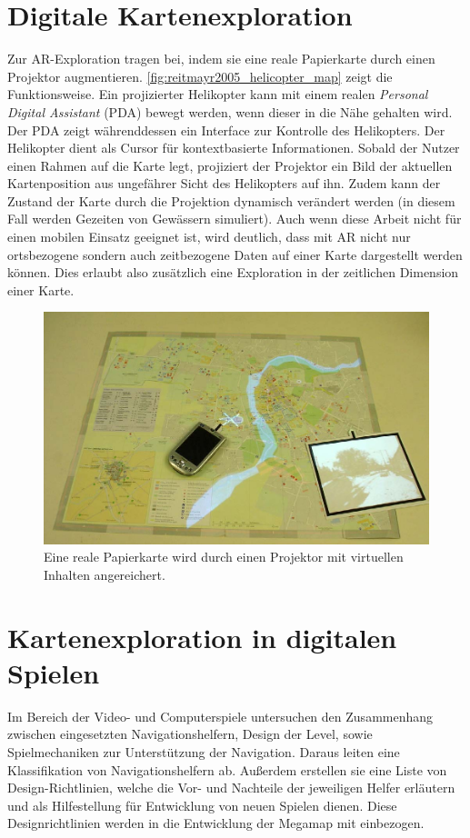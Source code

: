 \section{Digitale Kartenexploration}
Zur AR-Exploration tragen \textcite{Reitmayr2005} bei, indem sie eine reale Papierkarte durch einen Projektor augmentieren.
\autoref{fig:reitmayr2005_helicopter_map} zeigt die Funktionsweise.
Ein projizierter Helikopter kann mit einem realen \emph{Personal Digital Assistant} (PDA) bewegt werden, wenn dieser in die Nähe gehalten wird.
Der PDA zeigt währenddessen ein Interface zur Kontrolle des Helikopters.
Der Helikopter dient als Cursor für kontextbasierte Informationen.
Sobald der Nutzer einen Rahmen auf die Karte legt, projiziert der Projektor ein Bild der aktuellen Kartenposition aus ungefährer Sicht des Helikopters auf ihn.
Zudem kann der Zustand der Karte durch die Projektion dynamisch verändert werden (in diesem Fall werden Gezeiten von Gewässern simuliert).
Auch wenn diese Arbeit nicht für einen mobilen Einsatz geeignet ist, wird deutlich, dass mit AR nicht nur ortsbezogene sondern auch zeitbezogene Daten auf einer Karte dargestellt werden können.
Dies erlaubt also zusätzlich eine Exploration in der zeitlichen Dimension einer Karte.

\begin{figure}
    \includegraphics[width=\textwidth]{figures/reitmayr2005_helicopter_map.png}
    \caption{Eine reale Papierkarte wird durch einen Projektor mit virtuellen Inhalten angereichert.}
    \label{fig:reitmayr2005_helicopter_map}
\end{figure}

\section{Kartenexploration in digitalen Spielen}
Im Bereich der Video- und Computerspiele untersuchen \textcites{Moura2014}{Moura2015} den Zusammenhang zwischen eingesetzten Navigationshelfern, Design der Level, sowie Spielmechaniken zur Unterstützung der Navigation.
Daraus leiten \textcite{Moura2015} eine Klassifikation von Navigationshelfern ab.
Außerdem erstellen sie eine Liste von Design-Richtlinien, welche die Vor- und Nachteile der jeweiligen Helfer erläutern und als Hilfestellung für Entwicklung von neuen Spielen dienen.
Diese Designrichtlinien werden in die Entwicklung der Megamap mit einbezogen.

